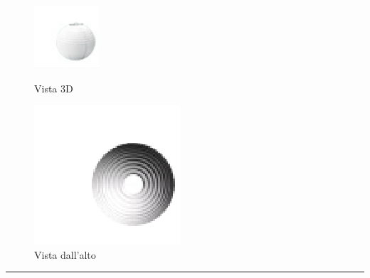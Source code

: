 \documentclass[italian, 12pt, a4paper]{article}
\begin{document}
\begin{figure}[h!]
    \centering
    \begin{minipage}{0.45\textwidth}
        \centering
        \includegraphics[width=\linewidth]{img/lampada.png} %
        \caption{Vista 3D}
    \end{minipage} \hfill
    \begin{minipage}{0.45\textwidth}
        \centering
        \includegraphics[width=\linewidth]{img/lampada-top.png} %
        \caption{Vista dall'alto}
    \end{minipage}
\end{figure}
\hrule
\end{document}
